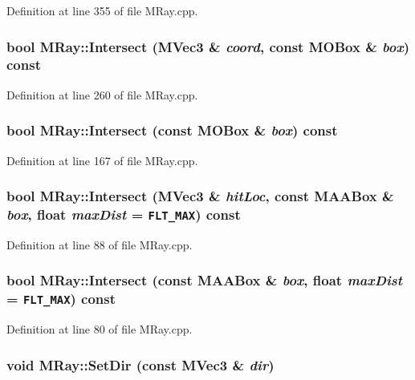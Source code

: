 Definition at line 355 of file MRay.cpp.\hypertarget{class_m_ray_31a2e259d2ce5afbe1c7ee8cbcc60e63}{
\subsubsection[{Intersect}]{\setlength{\rightskip}{0pt plus 5cm}bool MRay::Intersect ({\bf MVec3} \& {\em coord}, \/  const {\bf MOBox} \& {\em box}) const}}
\label{class_m_ray_31a2e259d2ce5afbe1c7ee8cbcc60e63}




Definition at line 260 of file MRay.cpp.\hypertarget{class_m_ray_a1ba271e3402f579aa42db8bf9ff42f0}{
\subsubsection[{Intersect}]{\setlength{\rightskip}{0pt plus 5cm}bool MRay::Intersect (const {\bf MOBox} \& {\em box}) const}}
\label{class_m_ray_a1ba271e3402f579aa42db8bf9ff42f0}




Definition at line 167 of file MRay.cpp.\hypertarget{class_m_ray_fb0bbae116de05c8e324382792caa4c0}{
\subsubsection[{Intersect}]{\setlength{\rightskip}{0pt plus 5cm}bool MRay::Intersect ({\bf MVec3} \& {\em hitLoc}, \/  const {\bf MAABox} \& {\em box}, \/  float {\em maxDist} = {\tt FLT\_\-MAX}) const}}
\label{class_m_ray_fb0bbae116de05c8e324382792caa4c0}




Definition at line 88 of file MRay.cpp.\hypertarget{class_m_ray_d58f4fca993f73968696e69fa58f4a93}{
\subsubsection[{Intersect}]{\setlength{\rightskip}{0pt plus 5cm}bool MRay::Intersect (const {\bf MAABox} \& {\em box}, \/  float {\em maxDist} = {\tt FLT\_\-MAX}) const}}
\label{class_m_ray_d58f4fca993f73968696e69fa58f4a93}




Definition at line 80 of file MRay.cpp.\hypertarget{class_m_ray_8239de44f8ebfe53f5d702aafb2e4804}{
\subsubsection[{SetDir}]{\setlength{\rightskip}{0pt plus 5cm}void MRay::SetDir (const {\bf MVec3} \& {\em dir})}}
\label{class_m_ray_8239de44f8ebfe53f5d702aafb2e4804}




